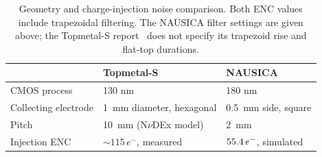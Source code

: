 \begin{table}[!htbp]
 \centering
 \begin{tabular}{lll}
 \toprule
 & Topmetal-S & NAUSICA \\
 \midrule
 CMOS process & 130 nm & 180 nm \\
 Collecting electrode & \SI{1}{mm} diameter, hexagonal & \SI{0.5}{mm} side, square \\
 Pitch & \SI{10}{mm} (N$\nu$DEx model) & \SI{2}{mm} \\
 Injection ENC & $\sim115\,e^-$, measured & $55.4\,e^-$, simulated \\
 \bottomrule
 \end{tabular}
 \caption{Geometry and charge-injection noise comparison. Both ENC values
 include trapezoidal filtering. The NAUSICA filter settings are given above;
 the Topmetal-S report~\cite{Yang2024TopmetalCSA} does not specify its
 trapezoid rise and flat-top durations.}
 \label{tab:topmetal_comparison}
\end{table}
